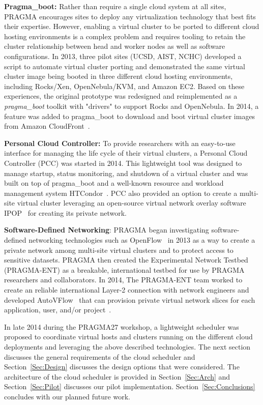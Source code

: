 \documentclass[times]{cpeauth}
\begin{document}
\textbf{Pragma\_boot:}  Rather than require a single cloud system at all sites, PRAGMA encourages sites to  deploy any virtualization technology that best fits their expertise. However, enabling a virtual cluster to be ported to different cloud hosting environments is a complex problem and requires tooling to retain the cluster relationship between head and worker nodes as well as software configurations.  In 2013, three pilot sites (UCSD, AIST, NCHC) developed a script to automate virtual cluster porting and demonstrated the same virtual cluster image being booted in three different cloud hosting environments, including Rocks/Xen, OpenNebula/KVM, and Amazon EC2.  Based on these experiences, the original prototype was redesigned and reimplemented as a \textit{pragma\_boot} toolkit with "drivers" to support  Rocks and OpenNebula.  In 2014, a feature was added to pragma\_boot to download and boot virtual cluster images from Amazon CloudFront~\cite{cloudfront}.

\textbf{Personal Cloud Controller:}  To provide researchers with an easy-to-use interface for managing the life cycle of their virtual clusters, a Personal Cloud Controller (PCC)  was started in 2014. This lightweight tool was designed to manage startup, status monitoring, and shutdown of a virtual cluster and was built on top of pragma\_boot and a well-known resource and workload management system HTCondor~\cite{condor}.   PCC also provided an option to create a multi-site virtual cluster leveraging an open-source virtual network overlay software IPOP~\cite{ipop} for creating its private network.  

\textbf{Software-Defined Networking}:   PRAGMA began investigating software-defined networking technologies such as OpenFlow~\cite{openflow} in 2013 as a way to create a private network among multi-site virtual clusters and to protect access to sensitive datasets.  PRAGMA then created the Experimental Network Testbed (PRAGMA-ENT) as a breakable, international testbed for use by PRAGMA researchers and collaborators.  In 2014, The PRAGMA-ENT team worked to create an reliable international Layer-2 connection with network engineers and developed AutoVFlow~\cite{autovflow} that can provision private virtual network slices for each application, user, and/or project~\cite{pragmaReport2014}.  

In late 2014 during the PRAGMA27 workshop, a lightweight scheduler was proposed to coordinate virtual hosts and clusters running on the different cloud deployments  and leveraging the above described technologies.  The next section discusses the general requirements of the cloud scheduler and Section~\ref{Sec:Design} discusses the design options that were considered.  The architecture of the cloud scheduler is provided in Section~\ref{Sec:Arch} and Section~\ref{Sec:Pilot} discusses our pilot implementation.  Section~\ref{Sec:Conclusions} concludes with our planned future work.  
\end{document}

